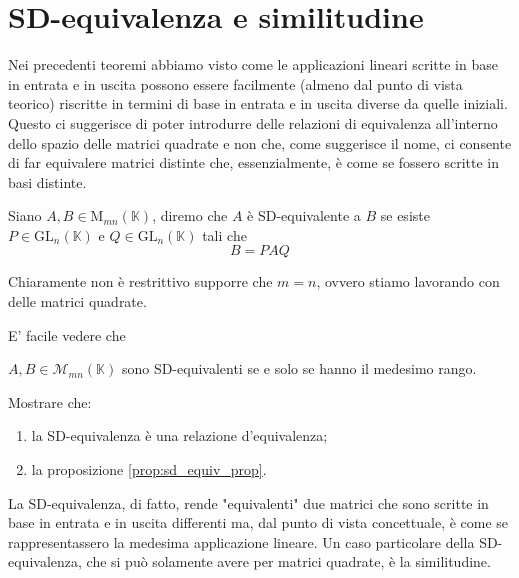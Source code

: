 \section{SD-equivalenza e similitudine}

Nei precedenti teoremi abbiamo visto come le applicazioni lineari scritte in base in entrata e in uscita possono essere facilmente (almeno dal punto di vista teorico) riscritte in termini di base in entrata e in uscita diverse da quelle iniziali.
Questo ci suggerisce di poter introdurre delle relazioni di equivalenza all'interno dello spazio delle matrici quadrate e non che, come suggerisce il nome, ci consente di far equivalere matrici distinte che, essenzialmente, è come se fossero scritte in basi distinte.

\begin{definition}[SD-equivalenza]
  Siano $A, B \in \text{M}_{mn}(\mathbb{K})$, diremo che $A$ è SD-equivalente a $B$ se esiste $P \in \text{GL}_n(\mathbb{K})$ e $Q \in \text{GL}_n(\mathbb{K})$ tali che
  $$
    B = P A Q
  $$
\end{definition}
\begin{remark}
  Chiaramente non è restrittivo supporre che $m=n$, ovvero stiamo lavorando con delle matrici quadrate.
\end{remark}
E' facile vedere che
\begin{prop}
  \label{prop:sd_equiv_prop}
  $A, B \in \mathcal{M}_{mn}(\mathbb{K})$ sono SD-equivalenti se e solo se hanno il medesimo rango.
\end{prop}
\begin{exercise}
Mostrare che:
  \begin{enumerate}[label=\protect\circled{\arabic*}]
    \item la SD-equivalenza è una relazione d'equivalenza;
    \item la proposizione \ref{prop:sd_equiv_prop}.
  \end{enumerate}
\end{exercise}
La SD-equivalenza, di fatto, rende "equivalenti" due matrici che sono scritte in base in entrata e in uscita differenti ma, dal punto di vista concettuale, è come se rappresentassero la medesima applicazione lineare. Un caso particolare della SD-equivalenza, che si può solamente avere
per matrici quadrate, è la similitudine.